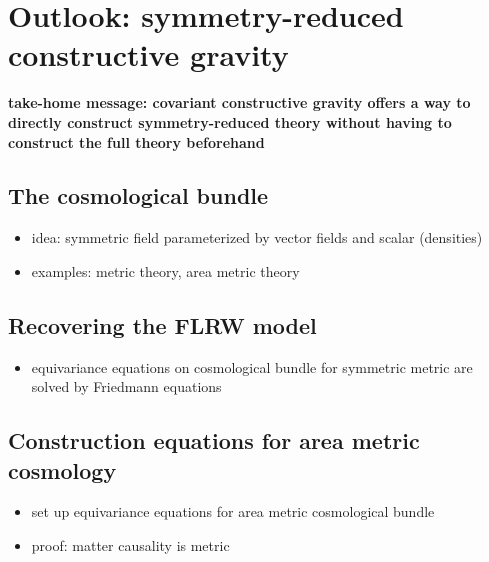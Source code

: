 \chapter{Outlook: symmetry-reduced constructive gravity}

\textbf{take-home message: covariant constructive gravity offers a way to directly construct symmetry-reduced theory without having to construct the full theory beforehand}

\section{The cosmological bundle}
\begin{itemize}
\item idea: symmetric field parameterized by vector fields and scalar (densities)
\item examples: metric theory, area metric theory
\end{itemize}

\section{Recovering the FLRW model}
\begin{itemize}
\item equivariance equations on cosmological bundle for symmetric metric are solved by Friedmann equations
\end{itemize}

\section{Construction equations for area metric cosmology}
\begin{itemize}
\item set up equivariance equations for area metric cosmological bundle
\item proof: matter causality is metric
\end{itemize}

